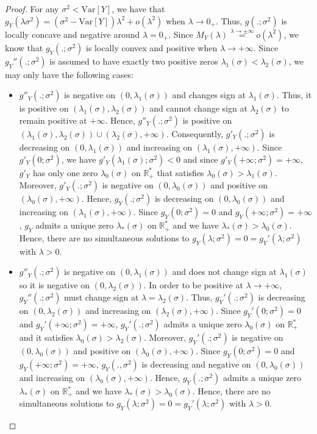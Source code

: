 \documentclass[a4paper, 10pt]{article}
\theoremstyle{definition}
\begin{document}
\begin{proof}For any $\sigma^2<\text{Var}[Y]$, we have that $g_Y(\lambda\sigma^2)=(\sigma^2-\text{Var}[Y])\lambda^2+o(\lambda^2)$ when $\lambda\to 0_+$. Thus, $g(.;\sigma^2)$ is locally concave and negative around $\lambda=0_+$. Since  $M_Y(\lambda)\overset{\lambda\to \pm\infty}{=}o(\lambda^2)$, we know that $g_Y(.;\sigma^2)$ is locally convex and positive when $\lambda\to +\infty$. Since $g_Y''(.;\sigma^2)$ is assumed to have exactly two positive zeros $\lambda_1(\sigma)<\lambda_2(\sigma)$, we may only have the following cases:
\begin{itemize}
    \item $g''_Y(.;\sigma^2)$ is negative on $(0,\lambda_1(\sigma))$ and changes sign at $\lambda_1(\sigma)$. Thus, it is positive on $(\lambda_1(\sigma),\lambda_2(\sigma))$ and cannot change sign at $\lambda_2(\sigma)$ to remain positive at $+\infty$. Hence, $g''_Y(.;\sigma^2)$ is positive on $(\lambda_1(\sigma),\lambda_2(\sigma))\cup (\lambda_2(\sigma),+\infty)$. Consequently, $g'_Y(.;\sigma^2)$ is decreasing on $(0,\lambda_1(\sigma))$ and increasing on $(\lambda_1(\sigma),+\infty)$. Since $g'_Y(0;\sigma^2)$, we have $g'_Y(\lambda_1(\sigma);\sigma^2)<0$ and since $g'_Y(+\infty;\sigma^2)=+\infty$, $g'_Y$ has only one zero $\lambda_0(\sigma)$ on $\mathbb{R}_+^*$ that satisfies $\lambda_0(\sigma)>\lambda_1(\sigma)$. Moreover, $g'_Y(.;\sigma^2)$ is negative on $(0,\lambda_0(\sigma))$ and positive on $(\lambda_0(\sigma),+\infty)$. Hence, $g_Y(.;\sigma^2)$ is decreasing on $(0,\lambda_0(\sigma))$ and increasing on $(\lambda_1(\sigma),+\infty)$. Since $g_Y(0;\sigma^2)=0$ and $g_Y(+\infty;\sigma^2)=+\infty$, $g_Y$ admits a unique zero $\lambda_*(\sigma)$ on $\mathbb{R}_+^*$ and we have $\lambda_*(\sigma)>\lambda_0(\sigma)$. Hence, there are no simultaneous solutions to $g_Y(\lambda;\sigma^2)=0=g_Y'(\lambda;\sigma^2)$ with $\lambda>0$.
    \item $g''_Y(.;\sigma^2)$ is negative on $(0,\lambda_1(\sigma))$ and does not change sign at $\lambda_1(\sigma)$ so it is negative on $(0,\lambda_2(\sigma))$. In order to be positive at $\lambda\to +\infty$, $g_Y''(.;\sigma^2)$ must change sign at $\lambda=\lambda_2(\sigma)$. Thus, $g_Y'(.;\sigma^2)$ is decreasing on $(0,\lambda_2(\sigma))$ and increasing on $(\lambda_2(\sigma),+\infty)$. Since $g_Y'(0;\sigma^2)=0$ and $g_Y'(+\infty;\sigma^2)=+\infty$, $g_Y'(.;\sigma^2)$ admits a unique zero $\lambda_0(\sigma)$ on $\mathbb{R}_+^*$ and it satisfies $\lambda_0(\sigma)>\lambda_2(\sigma)$. Moreover, $g_Y'(.;\sigma^2)$ is negative on $(0,\lambda_0(\sigma))$ and positive on $(\lambda_0(\sigma),+\infty)$. Since $g_Y(0;\sigma^2)=0$ and $g_Y(+\infty;\sigma^2)=+\infty$, $g_Y(.,\sigma^2)$ is decreasing and negative on $(0,\lambda_0(\sigma))$ and increasing on $(\lambda_0(\sigma),+\infty)$. Hence, $g_Y(.;\sigma^2)$ admits a unique zero $\lambda_*(\sigma)$ on $\mathbb{R}_+^*$ and we have $\lambda_*(\sigma)>\lambda_0(\sigma)$. Hence, there are no simultaneous solutions to $g_Y(\lambda;\sigma^2)=0=g_Y'(\lambda;\sigma^2)$ with $\lambda>0$.
\end{itemize}
\end{proof}
\end{document}
